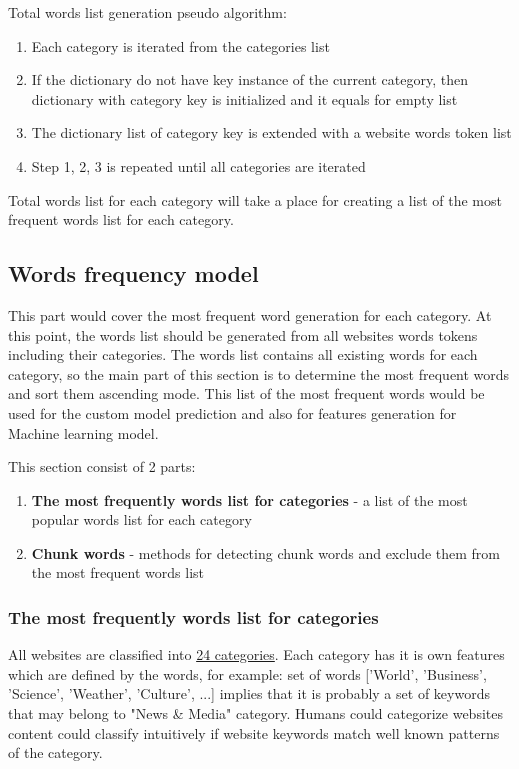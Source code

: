 Total words list generation pseudo algorithm:
\begin{enumerate}
    \item Each category is iterated from the categories list
    \item If the dictionary do not have key instance of the current category, then dictionary with category key is initialized and it equals for empty list
    \item The dictionary list of category key is extended with a website words token list
    \item Step 1, 2, 3 is repeated until all categories are iterated
\end{enumerate}

Total words list for each category will take a place for creating a list of the most frequent words list for each category.


\subsection{Words frequency model}

This part would cover the most frequent word generation for each category. At this point, the words list should be generated from all websites words tokens including their categories. The words list contains all existing words for each category, so the main part of this section is to determine the most frequent words and sort them ascending mode. This list of the most frequent words would be used for the custom model prediction and also for features generation for Machine learning model.

This section consist of 2 parts:
\begin{enumerate}
    \item \textbf{The most frequently words list for categories} - a list of the most popular words list for each category
    \item \textbf{Chunk words} - methods for detecting chunk words and exclude them from the most frequent words list
\end{enumerate}


\subsubsection{The most frequently words list for categories}


All websites are classified into \hyperref[sec:categoriesSet]{24 categories}. Each category has it is own features which are defined by the words, for example: set of words ['World', 'Business', 'Science', 'Weather', 'Culture', ...] implies that it is probably a set of keywords that may belong to "News & Media" category. Humans could categorize websites content could classify intuitively if website keywords match well known patterns of the category.


